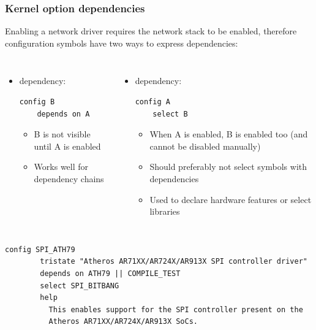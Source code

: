 \begin{frame}[fragile]
  \frametitle{Kernel option dependencies}
  Enabling a network driver requires the network stack to be enabled,
  therefore configuration symbols have two ways to express dependencies:
  \begin{columns}
    \begin{itemize}
    \item {} dependency:
\scriptsize
\begin{verbatim}
config B
    depends on A
\end{verbatim}
      \begin{itemize}
      \item B is not visible until A is enabled
      \item Works well for dependency chains
      \end{itemize}
    \end{itemize}
    \begin{itemize}
    \item {} dependency:
\scriptsize
\begin{verbatim}
config A
    select B
\end{verbatim}
      \begin{itemize}
      \item When A is enabled, B is enabled too (and cannot be disabled
        manually)
      \item Should preferably not select symbols with 
        dependencies
      \item Used to declare hardware features or select libraries
      \end{itemize}
    \end{itemize}
  \end{columns}
  \vfill
  \scriptsize
\begin{verbatim}
config SPI_ATH79
        tristate "Atheros AR71XX/AR724X/AR913X SPI controller driver"
        depends on ATH79 || COMPILE_TEST
        select SPI_BITBANG
        help
          This enables support for the SPI controller present on the
          Atheros AR71XX/AR724X/AR913X SoCs.
\end{verbatim}
\end{frame}

